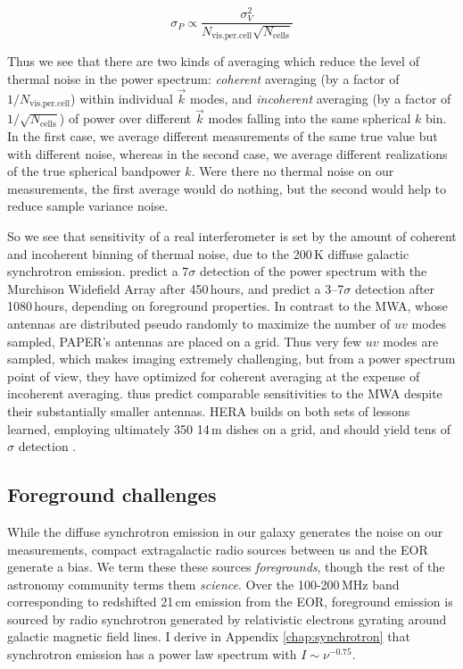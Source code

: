 \begin{equation}
	\sigma_P\propto\frac{\sigma_V^2}{N_\text{vis.per.cell}\sqrt{N_\text{cells}}}
\end{equation}

Thus we see that there are two kinds of averaging which reduce the level of thermal noise in the power spectrum: \textit{coherent} averaging (by a factor of $1/N_\text{vis.per.cell}$) within individual $\vec{k}$ modes, and \textit{incoherent} averaging (by a factor of $1/\sqrt{N_\text{cells}}$) of power over different $\vec{k}$ modes falling into the same spherical $k$ bin. In the first case, we average different measurements of the same true value but with different noise, whereas in the second case, we average different realizations of the true spherical bandpower $k$. Were there no thermal noise on our measurements, the first average would do nothing, but the second would help to reduce sample variance noise. 

So we see that sensitivity of a real interferometer is set by the amount of coherent and incoherent binning of thermal noise, due to the 200\,K diffuse galactic synchrotron emission.  \citet{beardsley13} predict a $7\sigma$ detection of the power spectrum with the Murchison Widefield Array after 450\,hours, and \citet{PoberNextGen} predict a 3--7$\sigma$ detection after 1080\,hours, depending on foreground properties. In contrast to the MWA, whose antennas are distributed pseudo randomly to maximize the number of $uv$ modes sampled, PAPER's antennas are placed on a grid. Thus very few $uv$ modes are sampled, which makes imaging extremely challenging, but from a power spectrum point of view, they have optimized for coherent averaging at the expense of incoherent averaging. \citet{PoberNextGen} thus predict comparable sensitivities to the MWA despite their substantially smaller antennas. HERA builds on both sets of lessons learned, employing ultimately 350 14\,m dishes on a grid, and should yield tens of $\sigma$ detection \citet{neben16b,ewallwice16,nithya16,PoberNextGen,patra16}. 

\subsection{Foreground challenges}

While the diffuse synchrotron emission in our galaxy generates the noise on our measurements, compact extragalactic radio sources between us and the EOR generate a bias. We term these these sources \textit{foregrounds}, though the rest of the astronomy community terms them \textit{science}. Over the 100-200\,MHz band corresponding to redshifted 21\,cm emission from the EOR, foreground emission is sourced by radio synchrotron generated by relativistic electrons gyrating around galactic magnetic field lines. I derive in Appendix \ref{chap:synchrotron} that synchrotron emission has a power law spectrum with $I\sim\nu^{-0.75}$.

